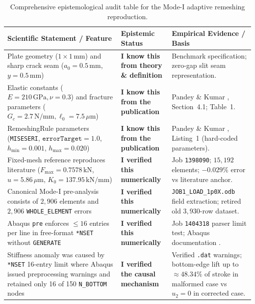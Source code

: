 \begin{table}[htbp]
  \centering
  \scriptsize
  \renewcommand{\arraystretch}{1.08}
  \caption{Comprehensive epistemological audit table for the Mode-I adaptive remeshing reproduction.}
  \label{tab:epistemological_matrix}
  \begin{tabularx}{\textwidth}{L{52mm} L{42mm} L{48mm}}
    \toprule
    \textbf{Scientific Statement / Feature} & \textbf{Epistemic Status} & \textbf{Empirical Evidence / Basis} \\
    \midrule
    Plate geometry ($1\times 1\,\mathrm{mm}$) and sharp crack seam ($a_0 = 0.5\,\mathrm{mm}$, $y=0.5\,\mathrm{mm}$) & \textbf{I know this from theory \& definition} & Benchmark specification; zero-gap slit seam representation. \\
    \addlinespace
    Elastic constants ($E=210\,\mathrm{GPa}, \nu=0.3$) and fracture parameters ($G_c=2.7\,\mathrm{N/mm}, \ell_0=7.5\,\mu\mathrm{m}$) & \textbf{I know this from the publication} & Pandey \& Kumar \citep{Pandey2025}, Section~4.1; Table~1. \\
    \addlinespace
    RemeshingRule parameters (\texttt{MISESERI}, $\texttt{errorTarget}=1.0$, $h_{\min}=0.001$, $h_{\max}=0.020$) & \textbf{I know this from the publication} & Pandey \& Kumar \citep{Pandey2025}, Listing~1 (hard-coded parameters). \\
    \addlinespace
    Fixed-mesh reference reproduces literature ($F_{\max}=0.7578\,\mathrm{kN}$, $u=5.86\,\mu\mathrm{m}$, $K_0=137.95\,\mathrm{kN/mm}$) & \textbf{I verified this numerically} & Job \texttt{1398090}; $15{,}192$ elements; $-0.029\%$ error vs literature anchor. \\
    \addlinespace
    Canonical Mode-I pre-analysis consists of $2{,}906$ elements and $2{,}906$ \texttt{WHOLE\_ELEMENT} errors & \textbf{I verified this numerically} & \texttt{JOB1\_LOAD\_1p0X.odb} field extraction; retired old $3{,}930$-row dataset. \\
    \addlinespace
    Abaqus \texttt{pre} enforces $\le 16$ entries per line in free-format \texttt{*NSET} without \texttt{GENERATE} & \textbf{I verified this numerically} & Job \texttt{1404318} parser limit test; Abaqus documentation \citep{Abaqus2023}. \\
    \addlinespace
    Stiffness anomaly was caused by \texttt{*NSET} 16-entry limit where Abaqus issued preprocessing warnings and retained only 16 of 150 \texttt{N\_BOTTOM} nodes & \textbf{I verified the causal mechanism} & Verified \texttt{.dat} warnings; bottom-edge lift up to $\approx 48.34\%$ of stroke in malformed case vs $u_2=0$ in corrected case. \\

\end{tabularx}
\end{table}
